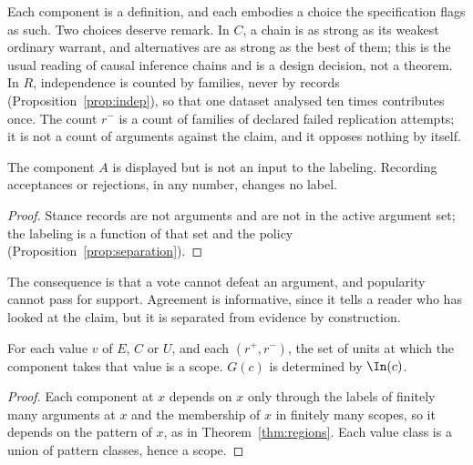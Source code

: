 Each component is a definition, and each embodies a choice the specification flags as such. Two choices deserve remark. In $C$, a chain is as strong as its weakest ordinary warrant, and alternatives are as strong as the best of them; this is the usual reading of causal inference chains and is a design decision, not a theorem. In $R$, independence is counted by families, never by records (Proposition~\ref{prop:indep}), so that one dataset analysed ten times contributes once. The count $r^-$ is a count of families of declared failed replication attempts; it is not a count of arguments against the claim, and it opposes nothing by itself.

\begin{proposition}\label{prop:agreement}
The component $A$ is displayed but is not an input to the labeling. Recording acceptances or rejections, in any number, changes no label.
\end{proposition}

\begin{proof}
Stance records are not arguments and are not in the active argument set; the labeling is a function of that set and the policy (Proposition~\ref{prop:separation}).
\end{proof}

The consequence is that a vote cannot defeat an argument, and popularity cannot pass for support. Agreement is informative, since it tells a reader who has looked at the claim, but it is separated from evidence by construction.

\begin{proposition}\label{prop:fieldscopes}
For each value $v$ of $E$, $C$ or $U$, and each $(r^+,r^-)$, the set of units at which the component takes that value is a scope. $G(c)$ is determined by $\In(c)$.
\end{proposition}

\begin{proof}
Each component at $x$ depends on $x$ only through the labels of finitely many arguments at $x$ and the membership of $x$ in finitely many scopes, so it depends on the pattern of $x$, as in Theorem~\ref{thm:regions}. Each value class is a union of pattern classes, hence a scope.
\end{proof}
